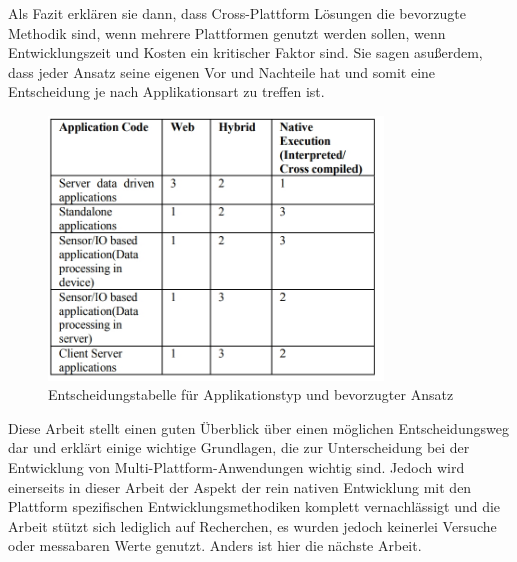 Als Fazit erklären sie dann, dass Cross-Plattform Lösungen die bevorzugte Methodik sind, wenn mehrere Plattformen genutzt werden sollen, wenn Entwicklungszeit und Kosten ein kritischer Faktor sind. Sie sagen asußerdem, dass jeder Ansatz seine eigenen Vor und Nachteile hat und somit eine Entscheidung je nach Applikationsart zu treffen ist. \cite{IEEE_Rahul_Seshu}
\begin{figure}[ht]
  \centering
  \includegraphics[height=7cm,keepaspectratio]{images/IEEE_related_chapter.jpg} 
  \caption{Entscheidungstabelle für Applikationstyp und bevorzugter Ansatz \cite{IEEE_Rahul_Seshu}}
  \label{fig:decision_table_IEEE_related_work}
\end{figure}

Diese Arbeit stellt einen guten Überblick über einen möglichen Entscheidungsweg dar und erklärt einige wichtige Grundlagen, die zur Unterscheidung bei der Entwicklung von Multi-Plattform-Anwendungen wichtig sind. Jedoch wird einerseits in dieser Arbeit der Aspekt der rein nativen Entwicklung mit den Plattform spezifischen Entwicklungsmethodiken komplett vernachlässigt und die Arbeit stützt sich lediglich auf Recherchen, es wurden jedoch keinerlei Versuche oder messabaren Werte genutzt. Anders ist hier die nächste Arbeit.


